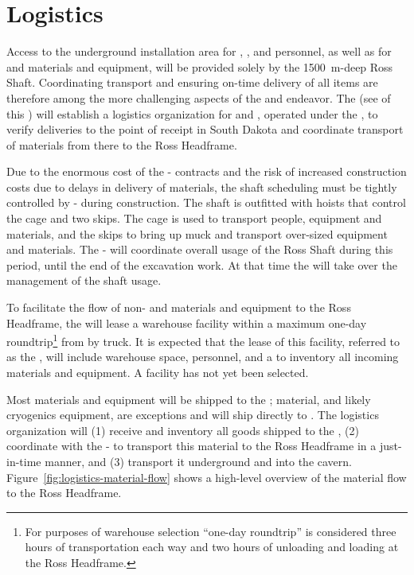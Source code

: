 \section{Logistics}
\label{sec:fdsp-tc-log}

Access to the underground installation area for ,   , and  personnel, as well as for   and   materials and equipment, will be provided solely by the \SI{1500}{m}-deep Ross Shaft. Coordinating transport and ensuring on-time delivery of all items are therefore among the more challenging aspects of the  and  endeavor. 
The  (see \tcchjpo %
of this ) will establish a logistics organization for  and , operated under the  , to verify deliveries to the point of receipt in South Dakota and coordinate transport of materials from there  to the Ross Headframe.   


Due to the enormous cost of the - contracts and the risk of increased construction costs due to delays in delivery of materials, the shaft scheduling must be tightly controlled by - during construction.
The shaft is outfitted with hoists that control the cage and two skips. The cage is used to transport people, equipment and materials, and the skips to bring up muck and transport over-sized equipment and materials. The -  will coordinate overall usage of the Ross Shaft during this period, until the end of the excavation work. At that  time the  will take over the management of the shaft usage.


To facilitate the flow of non-  and  materials and equipment to the Ross Headframe, the  will lease a warehouse facility within a maximum one-day roundtrip\footnote{For purposes of warehouse selection ``one-day roundtrip'' is considered three hours of transportation each way and two hours of unloading and loading at the Ross Headframe.} from  by truck. 
It is expected that the lease of this facility, referred to as the , will include warehouse space, personnel, and a  to inventory all incoming materials and equipment. 
A facility has not yet been selected. 


Most materials and equipment will be shipped to the ;  material, and likely cryogenics equipment, are exceptions and will ship directly to . 
The  logistics  organization will (1) receive and inventory all  goods shipped to the , (2) coordinate with the -  to transport this material to the Ross Headframe in a just-in-time manner, and (3) transport it underground and into the cavern. 
Figure~\ref{fig:logistics-material-flow} shows a high-level overview of the material flow to the Ross Headframe.

